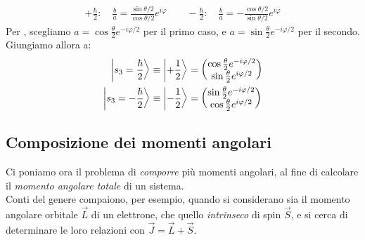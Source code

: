 \documentclass[../../FisicaTeorica.tex]{subfiles}
\begin{document}
\begin{align*}
+\frac{\hbar}{2}:\quad \frac{b}{a}=\frac{\sin\theta/2}{\cos\theta/2}e^{i\varphi}\qquad
-\frac{\hbar}{2}:\quad \frac{b}{a}=-\frac{\cos\theta/2}{\sin\theta/2} e^{i\varphi}
\end{align*}
Per , scegliamo $a = \cos\frac{\theta}{2}e^{-i\varphi/2}$ per il primo caso, e $a=\sin\frac{\theta}{2}e^{-i\varphi/2}$ per il secondo. Giungiamo allora a:
\begin{align}
\label{eqn:spin-eigenstates}
\Ket{s_3 = \frac{\hbar}{2}} &\equiv \Ket{+\frac{1}{2}} = \begin{pmatrix}
\cos\frac{\theta}{2}e^{-i\varphi/2}\\
\sin\frac{\theta}{2} e^{i\varphi/2}
\end{pmatrix}\\ \nonumber
\Ket{s_3 = -\frac{\hbar}{2}} &\equiv \Ket{-\frac{1}{2}} = \begin{pmatrix}
\sin\frac{\theta}{2} e^{-i\varphi/2}\\
\cos\frac{\theta}{2} e^{i\varphi/2}
\end{pmatrix}
\end{align}

\subsection{Composizione dei momenti angolari}
Ci poniamo ora il problema di \textit{comporre} più momenti angolari, al fine di calcolare il \textit{momento angolare totale} di un sistema.\\
Conti del genere compaiono, per esempio, quando si considerano sia il momento angolare orbitale $\vec{L}$ di un elettrone, che quello \textit{intrinseco} di spin $\vec{S}$, e si cerca di determinare le loro relazioni con $\vec{J}=\vec{L}+\vec{S}$.\\
\end{document}
